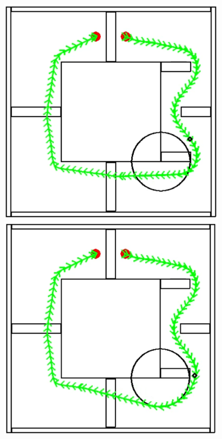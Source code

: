 \begin{figure}[!htb]
    \centering
    \begin{minipage}[b]{.3\linewidth}
        \centering
        \includegraphics[width=0.8\linewidth]{Figures/07_simulation/basic/04basic.png}
    \end{minipage}%
    \hfill%
    \begin{minipage}[b]{.3\linewidth}
        \centering
        \includegraphics[width=0.8\linewidth]{Figures/07_simulation/basic/05basic.png}
    \end{minipage}%
    \hfill%
    \begin{minipage}[b]{.3\linewidth}

\end{minipage}
\end{figure}
